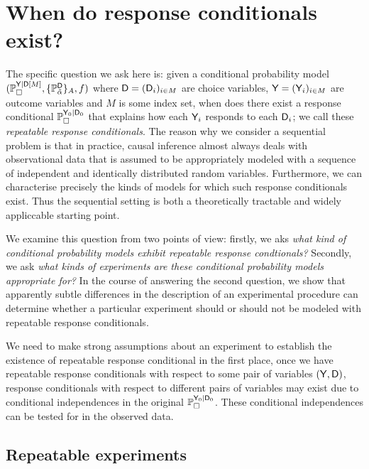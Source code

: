 
\section{When do response conditionals exist?}

The specific question we ask here is: given a conditional probability model $(\mathbb{P}_\square^{\mathsf{Y}|\mathsf{D}[M]},\{\mathbb{P}_{\tilde{\alpha}}^{\mathsf{D}}\}_A,f)$ where $\mathsf{D}=(\mathsf{D}_i)_{i\in M}$ are choice variables, $\mathsf{Y}=(\mathsf{Y}_i)_{i\in M}$ are outcome variables and $M$ is some index set, when does there exist a response conditional $\mathbb{P}_\square^{\mathsf{Y}_0|\mathsf{D}_0}$ that explains how each $\mathsf{Y}_i$ responds to each $\mathsf{D}_i$; we call these \emph{repeatable response conditionals}. The reason why we consider a sequential problem is that in practice, causal inference almost always deals with observational data that is assumed to be appropriately modeled with a sequence of independent and identically distributed random variables. Furthermore, we can characterise precisely the kinds of models for which such response conditionals exist. Thus the sequential setting is both a theoretically tractable and widely appliccable starting point.

We examine this question from two points of view: firstly,  we aks \emph{what kind of conditional probability models exhibit repeatable response condtionals?} Secondly, we ask \emph{what kinds of experiments are these conditional probability models appropriate for?} In the course of answering the second question, we show that apparently subtle differences in the description of an experimental procedure can determine whether a particular experiment should or should not be modeled with repeatable response conditionals.

We need to make strong assumptions about an experiment to establish the existence of repeatable response conditional in the first place, once we have repeatable response conditionals with respect to some pair of variables $(\mathsf{Y},\mathsf{D})$, response conditionals with respect to different pairs of variables may exist due to conditional independences in the original $\mathbb{P}_\square^{\mathsf{Y}_0|\mathsf{D}_0}$. These conditional independences can be tested for in the observed data.

\subsection{Repeatable experiments}

